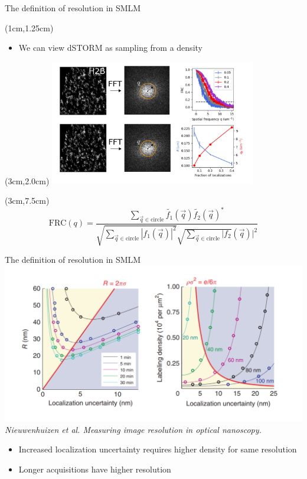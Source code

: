 \documentclass{beamer}					%
\begin{document}
\begin{frame}{The definition of resolution in SMLM}
\begin{textblock*}{13cm}(1cm,1.25cm)
\begin{itemize}
\item We can view dSTORM as sampling from a density
\end{itemize}
\end{textblock*}
\begin{textblock*}{9cm}(3cm,2.0cm)
\includegraphics[width=9cm]{FRC.png}
\end{textblock*}
\begin{textblock*}{8cm}(3cm,7.5cm)
\begin{equation*}
\mathrm{FRC}(q) = \frac{\sum_{\vec{q}\in\mathrm{circle}}\tilde{f_{1}}(\vec{q})\tilde{f_{2}}(\vec{q})^{*}}{\sqrt{\sum_{\vec{q}\in\mathrm{circle}}|f_{1}(\vec{q})|^{2}}\sqrt{\sum_{\vec{q}\in\mathrm{circle}}|f_{2}}(\vec{q})|^{2}}
\end{equation*}
\end{textblock*}
\end{frame}

\begin{frame}{The definition of resolution in SMLM}
\includegraphics[width=\textwidth]{Spatial.png}
\vspace{0.025in}
\textit{Nieuwenhuizen et al. Measuring image resolution in optical nanoscopy.}
\vspace{0.05in}
\begin{itemize}
\item Increased localization uncertainty requires higher density for same resolution
\item Longer acquisitions have higher resolution
\end{itemize}

\end{frame}
\end{document}
